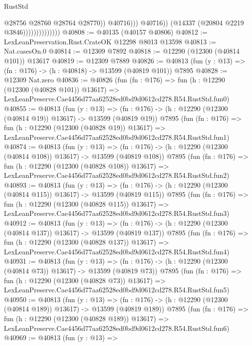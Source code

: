 \begin{lexlean}{RustStd}
\begin{coremodule}
                                          @28756
                                          @28760
                                          @28764
                                          @28770))
                                      @40716)))
                                @40716))
                            (@14337 (@20804 @2219 @3846))))))))))))))
@40808 := @40135 (@40157 @40806)
@40812 := LexLeanPreservation.Rust.CrateOK @12298 @8013 @13598
@40813 := Nat.casesOn.{0}
@40814 := @12309 @7892
@40818 := @12290 (@12300 (@40814 @101)) @13617
@40819 := @12309 @7889
@40826 := @40813 (fun (y : @13) => (fn : @176) -> (h : @40818) -> @13599 (@40819 @101)) @7895
@40828 := @12309 Nat.zero
@40836 := @40826
    (fun (fn : @176) =>
    fun (h : @12290 (@12300 (@40828 @101)) @13617) =>
    LexLeanPreserve.Cae4456d77aa62528ed0bd9d0612cd278.R54.RustStd.fun0)
@40855 := @40813
    (fun (y : @13) =>
    (fn : @176) -> (h : @12290 (@12300 (@40814 @19)) @13617) -> @13599 (@40819 @19))
    @7895
    (fun (fn : @176) =>
    fun (h : @12290 (@12300 (@40828 @19)) @13617) =>
    LexLeanPreserve.Cae4456d77aa62528ed0bd9d0612cd278.R54.RustStd.fun1)
@40874 := @40813
    (fun (y : @13) =>
    (fn : @176) -> (h : @12290 (@12300 (@40814 @108)) @13617) -> @13599 (@40819 @108))
    @7895
    (fun (fn : @176) =>
    fun (h : @12290 (@12300 (@40828 @108)) @13617) =>
    LexLeanPreserve.Cae4456d77aa62528ed0bd9d0612cd278.R54.RustStd.fun2)
@40893 := @40813
    (fun (y : @13) =>
    (fn : @176) -> (h : @12290 (@12300 (@40814 @115)) @13617) -> @13599 (@40819 @115))
    @7895
    (fun (fn : @176) =>
    fun (h : @12290 (@12300 (@40828 @115)) @13617) =>
    LexLeanPreserve.Cae4456d77aa62528ed0bd9d0612cd278.R54.RustStd.fun3)
@40912 := @40813
    (fun (y : @13) =>
    (fn : @176) -> (h : @12290 (@12300 (@40814 @137)) @13617) -> @13599 (@40819 @137))
    @7895
    (fun (fn : @176) =>
    fun (h : @12290 (@12300 (@40828 @137)) @13617) =>
    LexLeanPreserve.Cae4456d77aa62528ed0bd9d0612cd278.R54.RustStd.fun4)
@40931 := @40813
    (fun (y : @13) =>
    (fn : @176) -> (h : @12290 (@12300 (@40814 @73)) @13617) -> @13599 (@40819 @73))
    @7895
    (fun (fn : @176) =>
    fun (h : @12290 (@12300 (@40828 @73)) @13617) =>
    LexLeanPreserve.Cae4456d77aa62528ed0bd9d0612cd278.R54.RustStd.fun5)
@40950 := @40813
    (fun (y : @13) =>
    (fn : @176) -> (h : @12290 (@12300 (@40814 @189)) @13617) -> @13599 (@40819 @189))
    @7895
    (fun (fn : @176) =>
    fun (h : @12290 (@12300 (@40828 @189)) @13617) =>
    LexLeanPreserve.Cae4456d77aa62528ed0bd9d0612cd278.R54.RustStd.fun6)
@40969 := @40813
    (fun (y : @13) =>

\end{coremodule}
\end{lexlean}
